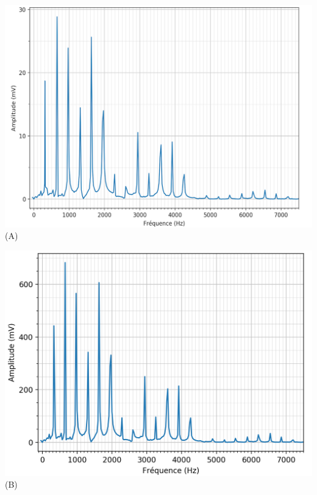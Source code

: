 \documentclass[a4paper,french,bookmarks]{article}
\begin{document}
\begin{center}
	\begin{minipage}[c]{0.48\linewidth}
		\centering
		\includegraphics[width=0.98\linewidth]{dm6fig/Fig-spectre2.png}\\
		(A)
	\end{minipage}
	\hfill
	\begin{minipage}[c]{0.48\linewidth}
		\centering
		\includegraphics[width=0.98\linewidth]{dm6fig/Fig-spectre6.png}\\
		(B)
	\end{minipage}
	
	\medskip


\end{center}
\end{document}
